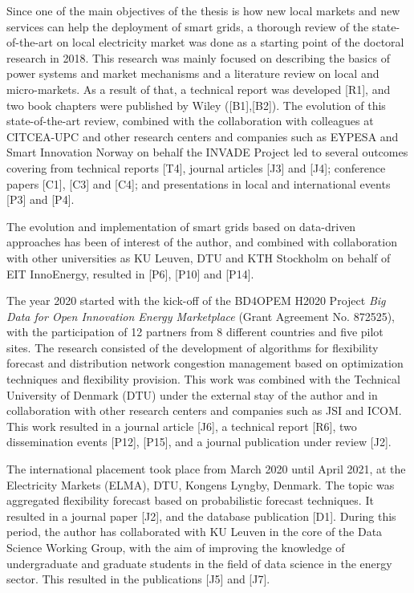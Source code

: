 Since one of the main objectives of the thesis is how new local markets and new services can help the deployment of smart grids, a thorough review of the state-of-the-art on local electricity market was done as a starting point of the doctoral research in 2018. This research was mainly focused on describing the basics of power systems and market mechanisms and a literature review on local and micro-markets. As a result of that, a technical report was developed [R1], and two book chapters were published by Wiley ([B1],[B2]).  The evolution of this state-of-the-art review, combined with the collaboration with colleagues at CITCEA-UPC and other research centers and companies such as EYPESA and Smart Innovation Norway on behalf the INVADE Project led to several outcomes covering from technical reports [T4], journal articles [J3] and [J4]; conference papers [C1], [C3] and [C4]; and presentations in local and international events [P3] and [P4].  

The evolution and implementation of smart grids based on data-driven approaches has been of interest of the author, and combined with collaboration with other universities as KU Leuven, DTU and KTH Stockholm on behalf of EIT InnoEnergy, resulted in [P6], [P10] and [P14]. 

The year 2020 started with the kick-off of the BD4OPEM H2020 Project \textit{Big Data for Open Innovation Energy Marketplace} (Grant Agreement No. 872525), with the participation of 12 partners from 8 different countries and five pilot sites. The research consisted of the development of algorithms for flexibility forecast and distribution network congestion management based on optimization techniques and flexibility provision. This work was combined with the Technical University of Denmark (DTU) under the external stay of the author and in collaboration with other research centers and companies such as JSI and ICOM. This work resulted in a journal article [J6], a technical report [R6], two dissemination events [P12], [P15], and a journal publication under review [J2].

The international placement took place from March 2020 until April 2021, at the Electricity Markets (ELMA), DTU, Kongens Lyngby, Denmark. The topic was aggregated flexibility forecast based on probabilistic forecast techniques. It resulted in a journal paper [J2], and the database publication [D1]. During this period, the author has collaborated with KU Leuven in the core of the Data Science Working Group, with the aim of improving the knowledge of undergraduate and graduate students in the field of data science in the energy sector. This resulted in the publications [J5] and [J7]. 

